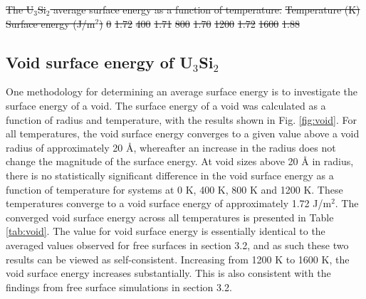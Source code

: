 \documentclass[review]{elsarticle}
\providecommand{\DIFdeltex}[1]{{\protect\color{red}\sout{#1}}}                      %
\providecommand{\DIFdelbegin}{} %
\providecommand{\DIFdelend}{} %
\providecommand{\DIFdelFL}[1]{\DIFdel{#1}} %
\providecommand{\DIFdel}[1]{\texorpdfstring{\DIFdeltex{#1}}{}} %
\newcommand{\DIFscaledelfig}{0.5}
\newlength{\DIFdelgraphicswidth} %
\newlength{\DIFdelgraphicsheight} %
\newcommand{\DIFdelincludegraphics}[2][]{%
\sbox{\DIFdelgraphicsbox}{\DIFOincludegraphics[#1]{#2}}%
\settoboxwidth{\DIFdelgraphicswidth}{\DIFdelgraphicsbox} %
\settoboxtotalheight{\DIFdelgraphicsheight}{\DIFdelgraphicsbox} %
\scalebox{\DIFscaledelfig}{%
\parbox[b]{\DIFdelgraphicswidth}{\usebox{\DIFdelgraphicsbox}\\[-\baselineskip] \rule{\DIFdelgraphicswidth}{0em}}\llap{\resizebox{\DIFdelgraphicswidth}{\DIFdelgraphicsheight}{%
\setlength{\unitlength}{\DIFdelgraphicswidth}%
\begin{picture}(1,1)%
\thicklines\linethickness{2pt} %
{\color[rgb]{1,0,0}\put(0,0){\framebox(1,1){}}}%
{\color[rgb]{1,0,0}\put(0,0){\line( 1,1){1}}}%
{\color[rgb]{1,0,0}\put(0,1){\line(1,-1){1}}}%
\end{picture}%
}\hspace*{3pt}}} %
} %
\DeclareRobustCommand{\DIFdelbegin}{\DIFOdelbegin \let\includegraphics\DIFdelincludegraphics} %
\DeclareRobustCommand{\DIFdelend}{\DIFOaddend \let\includegraphics\DIFOincludegraphics} %
\begin{document}
\DIFdelbegin %
{%
\DIFdelFL{The U$_{3}$Si$_{2}$ average surface energy as a function of temperature.}} %
\DIFdelFL{Temperature (K) }%
\DIFdelFL{Surface energy (J/m$^{2}$)}%
\DIFdelFL{0 }%
\DIFdelFL{1.72	 }%
\DIFdelFL{400 }%
\DIFdelFL{1.71 }%
\DIFdelFL{800 }%
\DIFdelFL{1.70	 }%
\DIFdelFL{1200 }%
\DIFdelFL{1.72 }%
\DIFdelFL{1600 }%
\DIFdelFL{1.88 }%

\DIFdelend \FloatBarrier

\subsection{Void surface energy of U$_{3}$Si$_{2}$}

One methodology for determining an average surface energy is to investigate the surface energy of a void. The surface energy of a void was calculated as a function of radius and temperature, with the results shown in Fig. \ref{fig:void}. For all temperatures, the void surface energy converges to a given value above a void radius of approximately 20 {\AA}, whereafter an increase in the radius does not change the magnitude of the surface energy. At void sizes above 20 {\AA} in radius, there is no statistically significant difference in the void surface energy as a function of temperature for systems at 0 K, 400 K, 800 K and 1200 K. These temperatures converge to a void surface energy of approximately 1.72 J/m$^{2}$. The converged void surface energy across all temperatures is presented in Table \ref{tab:void}. The value for void surface energy is essentially identical to the averaged values observed for free surfaces in section 3.2, and as such these two results can be viewed as self-consistent. Increasing from 1200 K to 1600 K, the void surface energy increases substantially. This is also consistent with the findings from free surface simulations in section 3.2. 
\end{document}
